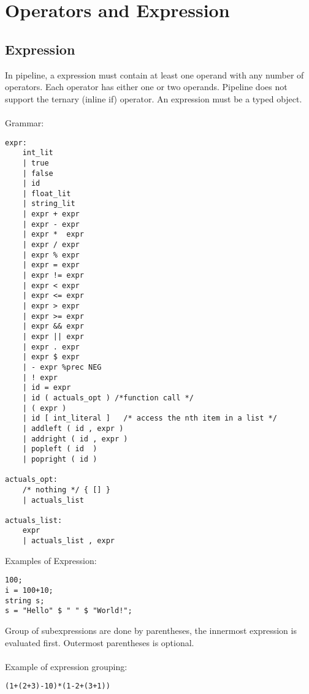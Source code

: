 \documentclass[./Report_main.tex]{subfiles}
\begin{document}
\section{Operators and Expression}
\subsection{Expression}
In pipeline, a expression must contain at least one operand with any number of operators. Each operator has either one or two operands. Pipeline does not support the ternary (inline if) operator. An expression must be a typed object.\\ 
\vspace{1mm}\\
Grammar:
\begin{lstlisting}
expr:
    int_lit
    | true
    | false
    | id
    | float_lit    
    | string_lit
    | expr + expr
    | expr - expr            
    | expr *  expr           
    | expr / expr           
    | expr % expr
    | expr = expr           
    | expr != expr           
    | expr < expr           
    | expr <= expr           
    | expr > expr           
    | expr >= expr           
    | expr && expr           
    | expr || expr           
    | expr . expr           
    | expr $ expr           
    | - expr %prec NEG       
    | ! expr                   
    | id = expr             
    | id ( actuals_opt ) /*function call */
    | ( expr )          
    | id [ int_literal ]   /* access the nth item in a list */ 
    | addleft ( id , expr )  
    | addright ( id , expr ) 
    | popleft ( id  ) 
    | popright ( id ) 
    
actuals_opt:
    /* nothing */ { [] }
    | actuals_list

actuals_list:
    expr
    | actuals_list , expr
\end{lstlisting}
Examples of Expression:
\begin{lstlisting}
100;
i = 100+10;
string s;
s = "Hello" $ " " $ "World!";
\end{lstlisting}
\vspace{1 mm}
Group of subexpressions are done by parentheses, the innermost expression is evaluated first. Outermost parentheses is optional.\\
\vspace{1 mm}\\
Example of expression grouping:
\begin{lstlisting}
(1+(2+3)-10)*(1-2+(3+1))
\end{lstlisting}
\end{document}
